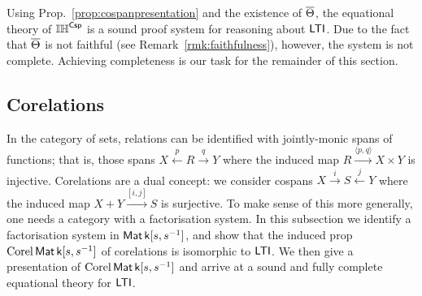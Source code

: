 Using Prop.~\ref{prop:cospanpresentation} and the existence of $\overline{\Theta}$,
the equational theory of $\mathbb{IH}^{\mathsf{Csp}}$ is a sound proof system for reasoning about
$\operatorname{\mathsf{LTI}}$. Due to the fact that $\overline{\Theta}$ is not faithful (see
Remark~\ref{rmk:faithfulness}), however, the system is not complete. Achieving
completeness is our task for the remainder of this section.


\subsection{Corelations}



In the category of sets, relations can be identified with jointly-monic spans of
functions; that is, those spans $X\xleftarrow{p}R\xrightarrow{q}Y$ where the
induced map $R\xrightarrow{\langle p,q\rangle}X\times Y$ is injective.
Corelations are a dual concept: we consider cospans
$X\xrightarrow{i}S\xleftarrow{j}Y$ where the induced map
$X+Y\xrightarrow{[i,j]}S$ is surjective. To make sense of this more generally,
one needs a category with a factorisation system. 
In this subsection we
identify a factorisation system in $\operatorname{\mathsf{Mat}}{\mathsf{k}[s,s^{-1}]}$, and show that the induced prop
$\operatorname{{Corel}}\operatorname{\mathsf{Mat}}{\mathsf{k}[s,s^{-1}]}$ of corelations is isomorphic to $\operatorname{\mathsf{LTI}}$.  We then give a
presentation of $\operatorname{{Corel}}\operatorname{\mathsf{Mat}}{\mathsf{k}[s,s^{-1}]}$ and arrive at a sound and fully complete
equational theory for $\operatorname{\mathsf{LTI}}$.


